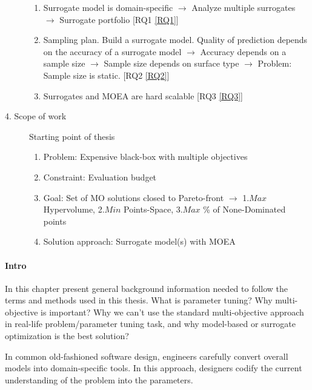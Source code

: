 \begin{blockquote}
\begin{description}
\begin{enumerate}
                    \item Surrogate model is domain-specific $\rightarrow$ Analyze multiple surrogates $\rightarrow$ Surrogate portfolio [RQ1 \ref{RQ1}]
                    \item Sampling plan. Build a surrogate model. Quality of prediction depends on the accuracy of a surrogate model  $\rightarrow$ Accuracy depends on a sample size $\rightarrow$ Sample size depends on surface type $\rightarrow$ Problem: Sample size is static. [RQ2 \ref{RQ2}]
                    \item Surrogates and MOEA are hard scalable [RQ3 \ref{RQ3}]
                \end{enumerate}
            \item[4. Scope of work] Starting point of thesis
                \begin{enumerate}
                    \item Problem: Expensive black-box with multiple objectives
                    \item Constraint: Evaluation budget
                    \item Goal: Set of MO solutions closed to Pareto-front $\rightarrow$ 1.$Max$ Hypervolume, 2.$Min$ Points-Space, 3.$Max$ \% of None-Dominated points 
                    \item Solution approach: Surrogate model(s) with MOEA
                \end{enumerate}
        \end{description}
    \end{blockquote}

    \paragraph{Intro}
    In this chapter present general background information needed to follow the terms and methods used in this thesis. What is parameter tuning? Why multi-objective is important? Why we can't use the standard multi-objective approach in real-life problem/parameter tuning task, and why model-based or surrogate optimization is the best solution?

    In common old-fashioned software design, engineers carefully convert overall models into domain-specific tools. In this approach, designers codify the current understanding of the problem into the parameters. 

